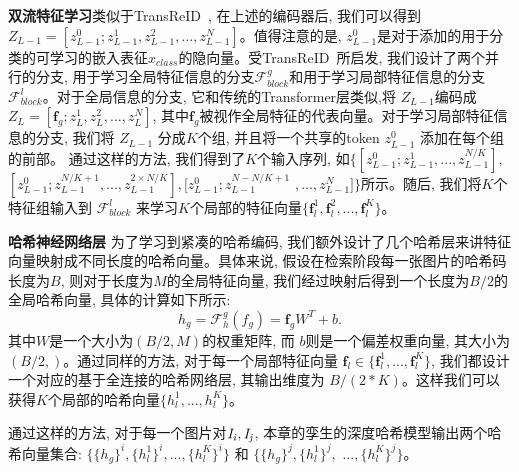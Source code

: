 \textbf{双流特征学习}\quad 类似于TransReID~\cite{he2021transreid}, 在上述的编码器后, 我们可以得到$Z_{L-1} = [z_{L-1}^0;z_{L-1}^1,z_{L-1}^2, ... ,z_{L-1}^N]$。值得注意的是, $z_{L-1}^0$是对于添加的用于分类的可学习的嵌入表征$x_{class}$的隐向量。受TransReID~\cite{he2021transreid}所启发, 我们设计了两个并行的分支, 用于学习全局特征信息的分支$\mathcal{F}^g_{block}$和用于学习局部特征信息的分支 $\mathcal{F}^l_{block}$。对于全局信息的分支, 它和传统的Transformer层类似,将 $Z_{L-1}$编码成$Z_{L} = [\mathbf{f}_g;z_L^1,z_L^2, ... ,z_L^  N]$, 其中$\mathbf{f}_g$被视作全局特征的代表向量。对于学习局部特征信息的分支, 我们将 $Z_{L-1}$ 分成$K$个组, 并且将一个共享的token $z_{L-1}^0$ 添加在每个组的前部。 通过这样的方法, 我们得到了$K$个输入序列, 如$ \{[z_{L-1}^0;z_{L-1}^1,...,z_{L-1}^{N/K}],$ $ [z_{L-1}^0;z_{L-1}^{N/K+1},...,z_{L-1}^{2\times N/K}], [z_{L-1}^0;z_{L-1}^{N-N/K+1}$ $,...,z_{L-1}^N]\}$所示。随后, 我们将$K$个特征组输入到 $\mathcal{F}^l_{block}$ 来学习$K$个局部的特征向量$\{\mathbf{f}_l^1,\mathbf{f}_l^2,...,\mathbf{f}_l^K\}$。\par
\textbf{哈希神经网络层}
为了学习到紧凑的哈希编码, 我们额外设计了几个哈希层来讲特征向量映射成不同长度的哈希向量。具体来说, 假设在检索阶段每一张图片的哈希码长度为$B$, 则对于长度为$M$的全局特征向量, 我们经过映射后得到一个长度为$B/2$的全局哈希向量, 具体的计算如下所示:
\begin{equation}
    h_g = \mathcal{F}_h^g(f_g) = \mathbf{f}_g W^T + b.
\end{equation}
其中$W$是一个大小为$(B/2,M)$的权重矩阵, 而 $b$则是一个偏差权重向量, 其大小为$(B/2,)$。通过同样的方法, 对于每一个局部特征向量 $\mathbf{f}_l \in \{\mathbf{f}_l^1,...,\mathbf{f}_l^K\}$, 我们都设计一个对应的基于全连接的哈希网络层, 其输出维度为 $B/(2*K)$。这样我们可以获得$K$个局部的哈希向量$\{h_l^1,...,h_l^K\}$。 \par
通过这样的方法, 对于每一个图片对$\it{I}_i, \it{I}_j$, 本章的孪生的深度哈希模型输出两个哈希向量集合:  $\{\{h_g\}^i,\{h_l^1\}^i,...,\{h_l^K\}^i\}$ 和 $\{\{h_g\}^j,\{h_l^1\}^j,$ $..., \{h_l^K\}^j\}$。
